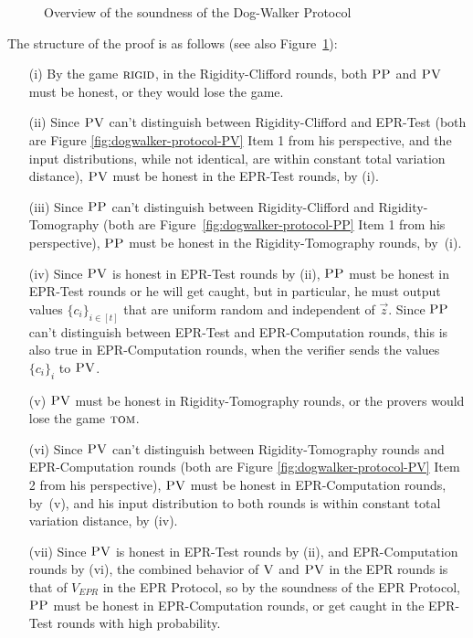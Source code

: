 \documentclass[11pt,letter]{article}
\theoremstyle{remark}
\theoremstyle{definition}
\newcommand{\rigid}{\textsc{rigid}}
\newcommand{\tom}{\textsc{tom}}
\newcommand{\ver}{\textsc{V}}
\newcommand{\pv}{\textsc{PV}}
\newcommand{\pp}{\textsc{PP}}
\begin{document}
\begin{figure}[H]
\caption{Overview of the soundness of the Dog-Walker Protocol}\label{fig:full-dog-walker}
\end{figure}

\noindent The structure of the proof is as follows (see also Figure~\ref{fig:full-dog-walker}):
\begin{enumerate}
\item[(i)] By the game $\rigid$, in the Rigidity-Clifford rounds, both $\pp$ and $\pv$ must be honest, or they would lose the game.
\item[(ii)] Since $\pv$ can't distinguish between Rigidity-Clifford and EPR-Test (both are Figure \ref{fig:dogwalker-protocol-PV} Item 1 from his perspective, and the input distributions, while not identical, are within constant total variation distance), $\pv$ must be honest in the EPR-Test rounds, by (i). 
\item[(iii)] Since $\pp$ can't distinguish between Rigidity-Clifford and Rigidity-Tomography (both are Figure~\ref{fig:dogwalker-protocol-PP} Item 1 from his perspective), $\pp$ must be honest in the Rigidity-Tomography rounds, by~(i). 
\item[(iv)] Since $\pv$ is honest in EPR-Test rounds by (ii), $\pp$ must be honest in EPR-Test rounds or he will get caught, but in particular, he must output values $\{c_i\}_{i\in [t]}$ that are uniform random and independent of $\vec{z}$. Since $\pp$ can't distinguish between EPR-Test and EPR-Computation rounds, this is also true in EPR-Computation rounds, when the verifier sends the values $\{c_i\}_i$ to $\pv$. 
\item[(v)] %
$\pv$ must be honest in Rigidity-Tomography rounds, or the provers would lose the game $\tom$.
\item[(vi)] Since $\pv$ can't distinguish between Rigidity-Tomography rounds and EPR-Computation rounds (both are Figure \ref{fig:dogwalker-protocol-PV} Item 2 from his perspective), $\pv$ must be honest in EPR-Computation rounds, by~(v), and his input distribution to both rounds is within constant total variation distance, by (iv).
\item[(vii)] Since $\pv$ is honest in EPR-Test rounds by (ii), and EPR-Computation rounds by (vi), the combined behavior of $\ver$ and $\pv$ in the EPR rounds is that of $V_{EPR}$ in the EPR Protocol, so
by the soundness of the EPR Protocol, $\pp$ must be honest in EPR-Computation rounds, or get caught in the EPR-Test rounds with high probability.
\end{enumerate}
\end{document}
